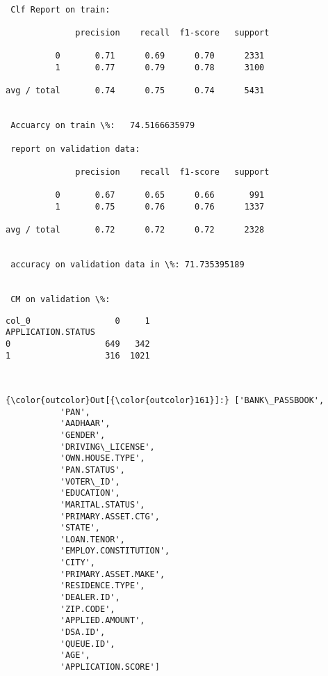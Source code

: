 \documentclass[11pt]{article}
\begin{document}
    \begin{Verbatim}[commandchars=\\\{\}]

 Clf Report on train: 

              precision    recall  f1-score   support

          0       0.71      0.69      0.70      2331
          1       0.77      0.79      0.78      3100

avg / total       0.74      0.75      0.74      5431


 Accuarcy on train \%:   74.5166635979

 report on validation data: 

              precision    recall  f1-score   support

          0       0.67      0.65      0.66       991
          1       0.75      0.76      0.76      1337

avg / total       0.72      0.72      0.72      2328


 accuracy on validation data in \%: 71.735395189


 CM on validation \%: 

    \end{Verbatim}

    
    \begin{verbatim}
col_0                 0     1
APPLICATION.STATUS           
0                   649   342
1                   316  1021
    \end{verbatim}

    
    \begin{center}
    \end{center}
    { \hspace*{\fill} \\}
    
\begin{Verbatim}[commandchars=\\\{\}]
{\color{outcolor}Out[{\color{outcolor}161}]:} ['BANK\_PASSBOOK',
           'PAN',
           'AADHAAR',
           'GENDER',
           'DRIVING\_LICENSE',
           'OWN.HOUSE.TYPE',
           'PAN.STATUS',
           'VOTER\_ID',
           'EDUCATION',
           'MARITAL.STATUS',
           'PRIMARY.ASSET.CTG',
           'STATE',
           'LOAN.TENOR',
           'EMPLOY.CONSTITUTION',
           'CITY',
           'PRIMARY.ASSET.MAKE',
           'RESIDENCE.TYPE',
           'DEALER.ID',
           'ZIP.CODE',
           'APPLIED.AMOUNT',
           'DSA.ID',
           'QUEUE.ID',
           'AGE',
           'APPLICATION.SCORE']
\end{Verbatim}
            
\end{document}
